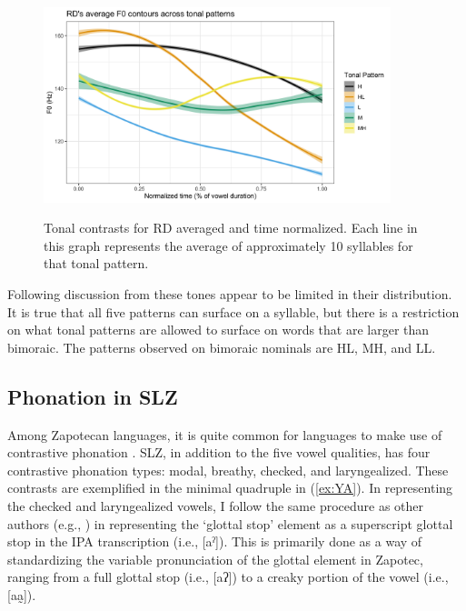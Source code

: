 \documentclass[12pt, letterpaper]{article}
\begin{document}
\begin{figure}[!ht]
	\centering
	\includegraphics[width=0.9\textwidth]{Images/RDTonePlot.png}
	\label{fig:RDTonePlot}
	\caption{Tonal contrasts for RD averaged and time normalized. Each line in this graph represents the average of approximately 10 syllables for that tonal pattern.}
\end{figure}

Following discussion from \citet{brinkerhoffTonalPatternsTheir2022} these tones appear to be limited in their distribution. It is true that all five patterns can surface on a syllable, but there is a restriction on what tonal patterns are allowed to surface on words that are larger than bimoraic. The patterns observed on bimoraic nominals are HL, MH, and LL.

\subsection{Phonation in SLZ} \label{sec:Phonation}

Among Zapotecan languages, it is quite common for languages to make use of contrastive phonation \citep[e.g.,][]{avelinobecerraTopicsYalalagZapotec2004,longDiccionarioZapotecoSan2005,avelinoAcousticElectroglottographicAnalyses2010,lopeznicolasEstudiosFonologiaGramatica2016,chavez-peonInteractionMetricalStructure2010}. 
SLZ, in addition to the five vowel qualities, has four contrastive phonation types: modal, breathy, checked, and laryngealized. These contrasts are exemplified in the minimal quadruple in (\ref{ex:YA}). In representing the checked and laryngealized vowels, I follow the same procedure as other authors (e.g., \citet{avelinoAcousticElectroglottographicAnalyses2010, uchiharaToneRegistrogenesisQuiavini2016}) in representing the `glottal stop' element as a superscript glottal stop in the IPA transcription (i.e., [aˀ]). This is primarily done as a way of standardizing the variable pronunciation of the glottal element in Zapotec, ranging from a full glottal stop (i.e., [aʔ]) to a creaky portion of the vowel (i.e., [aa̰]).  
\end{document}

